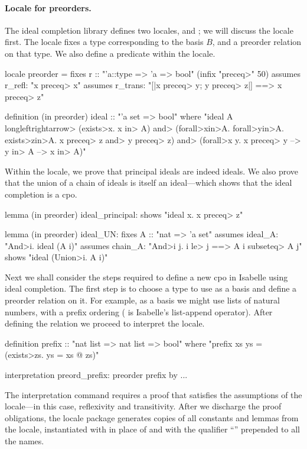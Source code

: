 \paragraph{Locale for preorders.} The  ideal completion library defines two locales,  and ; we will discuss the  locale first. The  locale fixes a type  corresponding to the basis $B$, and a preorder relation  on that type. We also define a predicate  within the locale.
%
\begin{isacode}
locale preorder =
  fixes r :: "'a::type => 'a => bool" (infix "\<preceq>" 50)
  assumes r_refl: "x \<preceq> x"
  assumes r_trans: "[|x \<preceq> y; y \<preceq> z|] ==> x \<preceq> z"
\end{isacode}
\unmedskip
{}
\begin{isacode}
definition (in preorder) ideal :: "'a set => bool"
  where "ideal A \<longleftrightarrow>
    (\<exists>x. x \<in> A) \<and> (\<forall>x\<in>A. \<forall>y\<in>A. \<exists>z\<in>A. x \<preceq> z \<and> y \<preceq> z) \<and>
    (\<forall>x y. x \<preceq> y --> y \<in> A --> x \<in> A)"
\end{isacode}
%
Within the  locale, we prove that principal ideals are indeed ideals. We also prove that the union of a chain of ideals is itself an ideal---which shows that the ideal completion is a cpo.
%
\begin{isacode}
lemma (in preorder) ideal_principal:
  shows "ideal {x. x \<preceq> z}"
\end{isacode}
\unmedskip
{}
\begin{isacode}
lemma (in preorder) ideal_UN:
  fixes A :: "nat => 'a set"
  assumes ideal_A: "\<And>i. ideal (A i)"
  assumes chain_A: "\<And>i j. i \<le> j ==> A i \<subseteq> A j"
  shows "ideal (\<Union>i. A i)"
\end{isacode}
%
Next we shall consider the steps required to define a new cpo in Isabelle using ideal completion. The first step is to choose a type to use as a basis and define a preorder relation on it. For example, as a basis we might use lists of natural numbers, with a prefix ordering ( is Isabelle's list-append operator). After defining the relation we proceed to interpret the  locale.
%
\begin{isacode}
definition prefix :: "nat list => nat list => bool"
  where "prefix xs ys = (\<exists>zs. ys = xs @ zs)"
\end{isacode}
\unmedskip
\begin{isacode}
interpretation preord_prefix: preorder prefix
  by ...
\end{isacode}
%
The interpretation command requires a proof that  satisfies the assumptions of the locale---in this case, reflexivity and transitivity. After we discharge the proof obligations, the locale package generates copies of all constants and lemmas from the  locale, instantiated with  in place of  and with the qualifier ``'' prepended to all the names.

